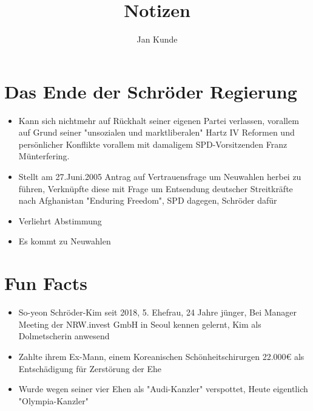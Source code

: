 \documentclass[14pt]{article}
\title{Notizen}
\author{Jan Kunde}
\date{}
\begin{document}
    \maketitle
    
    \section{Das Ende der Schröder Regierung}
        \begin{itemize}
            \item Kann sich nichtmehr auf Rückhalt seiner eigenen Partei verlassen, vorallem auf Grund seiner "unsozialen und marktliberalen" Hartz IV Reformen und 
                persönlicher Konflikte vorallem mit damaligem SPD-Vorsitzenden Franz Münterfering. 
            \item Stellt am 27.Juni.2005 Antrag auf Vertrauensfrage um Neuwahlen herbei zu führen, Verknüpfte diese mit Frage um Entsendung
                deutscher Streitkräfte nach Afghanistan "Enduring Freedom", SPD dagegen, Schröder dafür
            \item Verliehrt Abstimmung
            \item Es kommt zu Neuwahlen
        \end{itemize}

    \section{Fun Facts}
        \begin{itemize}
            \item So-yeon Schröder-Kim seit 2018, 5. Ehefrau, 24 Jahre jünger, Bei Manager Meeting der NRW.invest GmbH in Seoul kennen gelernt, Kim als Dolmetscherin anwesend
            \item Zahlte ihrem Ex-Mann, einem Koreanischen Schönheitschirurgen 22.000€ als Entschädigung für Zerstörung der Ehe 
            \item Wurde wegen seiner vier Ehen als "Audi-Kanzler" verspottet, Heute eigentlich "Olympia-Kanzler"
        \end{itemize}
\end{document}
